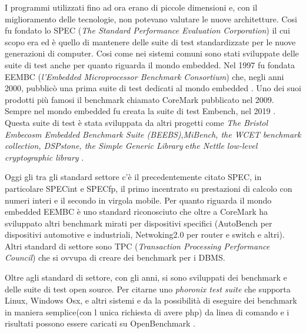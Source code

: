 \documentclass[12pt,a4paper]{report}
\begin{document}
    I programmi utilizzati fino ad ora erano di piccole dimensioni e, con il miglioramento delle tecnologie, non potevano valutare le nuove architetture.  Cosi fu fondato lo SPEC (\textit{The Standard Performance Evaluation Corporation}) il cui scopo era ed è quello di mantenere delle suite di test standardizzate per le nuove generazioni di computer. 
    Cosi come nei sistemi comuni sono stati sviluppate delle suite di test anche per quanto riguarda il mondo embedded. Nel 1997 fu fondata EEMBC (\textit{l'Embedded Microprocessor Benchmark Consortium}) che, negli anni 2000, pubblicò una prima suite di test dedicati al mondo embedded \cite{EEMBCSite}. %
    Uno dei suoi prodotti più famosi il benchmark chiamato CoreMark pubblicato nel 2009. %
    Sempre nel mondo embedded fu creata la suite di test Embench, nel 2019 \cite{embenchSite}. Questa suite di test è stata sviluppata da altri progetti come \textit{The Bristol Embecosm Embedded Benchmark Suite (BEEBS)},\textit{MiBench, the WCET benchmark collection, DSPstone, the Simple Generic Library} e\textit{the Nettle low-level cryptographic library}\cite{NettleSite}\cite{vittekBorovanskyMoreauTurin2006,}\cite{DSPStoneSite} \cite{WCETSite} \cite{MiBenchSite}.  %
    
    Oggi gli tra gli standard settore c'è il precedentemente citato SPEC, in particolare SPECint e SPECfp, il primo incentrato su prestazioni di calcolo con numeri interi e il secondo in virgola mobile.  
    Per quanto riguarda il mondo embedded EEMBC è uno standard riconosciuto che oltre a CoreMark ha sviluppato altri benchmark mirati per dispositivi specifici (AutoBench per dispositivi automotive e industriali, Netwoking2.0  per router e switch e altri). %
    Altri standard di settore sono TPC (\textit{Transaction Processing Performance Council}) che si ovvupa di creare dei benchmark per i DBMS\cite{TPCSite}. %

    Oltre agli standard di settore, con gli anni, si sono sviluppati dei benchmark e delle suite di test open source. Per citarne uno \textit{phoronix test suite}   \cite{ PhoronixTestSuiteSite}
    che supporta Linux, Windows Osx, e altri sistemi e da la possibilità di eseguire dei benchmark in maniera semplice(con l unica richiesta di avere php) da linea di comando e i risultati possono essere caricati su OpenBenchmark \cite{OpenBenchmarkSite}.
\end{document}
